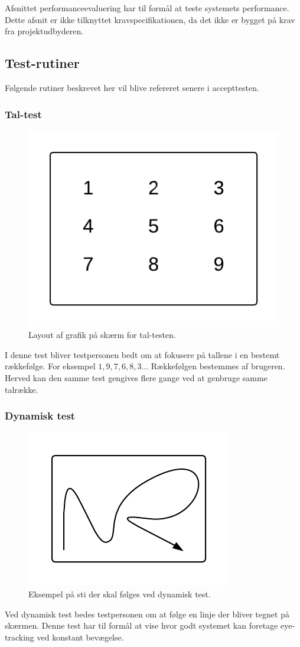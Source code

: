 \documentclass[accepttest.tex]{subfiles}
\begin{document}
Afsnittet performanceevaluering har til formål at teste systemets performance. Dette afsnit er ikke tilknyttet kravspecifikationen, da det ikke er bygget på krav fra projektudbyderen.
	  \pagebreak
\subsection{Test-rutiner}
Følgende rutiner beskrevet her vil blive refereret senere i accepttesten.
\subsubsection{Tal-test}
\label{taltest}
\begin{figure}
\centering
\includegraphics[width=0.5\linewidth]{Tal-test}
\caption{Layout af grafik på skærm for tal-testen.}
\label{fig:Tal-test}
\end{figure}
I denne test bliver testpersonen bedt om at fokusere på tallene i en bestemt rækkefølge. For eksempel $ 1,9,7,6,8,3\ldots $ Rækkefølgen bestemmes af brugeren. Herved kan den samme test gengives flere gange ved at genbruge samme talrække.

	  
\subsubsection{Dynamisk test}	  
\label{dyntest}
\begin{figure}
\centering
\includegraphics[width=0.4\linewidth]{DynamiskTest}
\caption{Eksempel på sti der skal følges ved dynamisk test.}
\label{fig:DynamiskTest}
\end{figure}
Ved dynamisk test bedes testpersonen om at følge en linje der bliver tegnet på skærmen. Denne test har til formål at vise hvor godt systemet kan foretage eye-tracking ved konstant bevægelse. 
\end{document}
